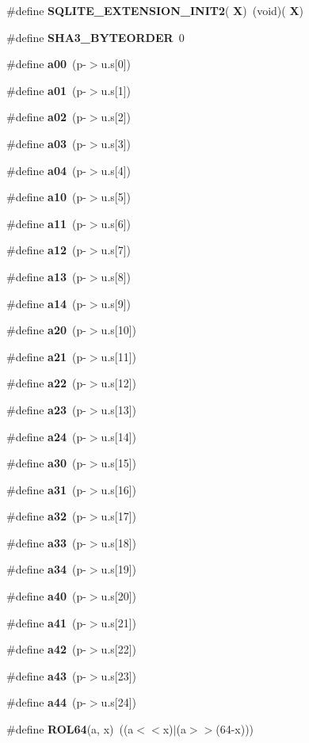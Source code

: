 \begin{DoxyCompactItemize}
\item 
\#define \textbf{ S\+Q\+L\+I\+T\+E\+\_\+\+E\+X\+T\+E\+N\+S\+I\+O\+N\+\_\+\+I\+N\+I\+T2}(\textbf{ X})~(void)(\textbf{ X})
\item 
\#define \textbf{ S\+H\+A3\+\_\+\+B\+Y\+T\+E\+O\+R\+D\+ER}~0
\item 
\#define \textbf{ a00}~(p-\/$>$u.\+s[0])
\item 
\#define \textbf{ a01}~(p-\/$>$u.\+s[1])
\item 
\#define \textbf{ a02}~(p-\/$>$u.\+s[2])
\item 
\#define \textbf{ a03}~(p-\/$>$u.\+s[3])
\item 
\#define \textbf{ a04}~(p-\/$>$u.\+s[4])
\item 
\#define \textbf{ a10}~(p-\/$>$u.\+s[5])
\item 
\#define \textbf{ a11}~(p-\/$>$u.\+s[6])
\item 
\#define \textbf{ a12}~(p-\/$>$u.\+s[7])
\item 
\#define \textbf{ a13}~(p-\/$>$u.\+s[8])
\item 
\#define \textbf{ a14}~(p-\/$>$u.\+s[9])
\item 
\#define \textbf{ a20}~(p-\/$>$u.\+s[10])
\item 
\#define \textbf{ a21}~(p-\/$>$u.\+s[11])
\item 
\#define \textbf{ a22}~(p-\/$>$u.\+s[12])
\item 
\#define \textbf{ a23}~(p-\/$>$u.\+s[13])
\item 
\#define \textbf{ a24}~(p-\/$>$u.\+s[14])
\item 
\#define \textbf{ a30}~(p-\/$>$u.\+s[15])
\item 
\#define \textbf{ a31}~(p-\/$>$u.\+s[16])
\item 
\#define \textbf{ a32}~(p-\/$>$u.\+s[17])
\item 
\#define \textbf{ a33}~(p-\/$>$u.\+s[18])
\item 
\#define \textbf{ a34}~(p-\/$>$u.\+s[19])
\item 
\#define \textbf{ a40}~(p-\/$>$u.\+s[20])
\item 
\#define \textbf{ a41}~(p-\/$>$u.\+s[21])
\item 
\#define \textbf{ a42}~(p-\/$>$u.\+s[22])
\item 
\#define \textbf{ a43}~(p-\/$>$u.\+s[23])
\item 
\#define \textbf{ a44}~(p-\/$>$u.\+s[24])
\item 
\#define \textbf{ R\+O\+L64}(a,  x)~((a$<$$<$x)$\vert$(a$>$$>$(64-\/x)))

\end{DoxyCompactItemize}
